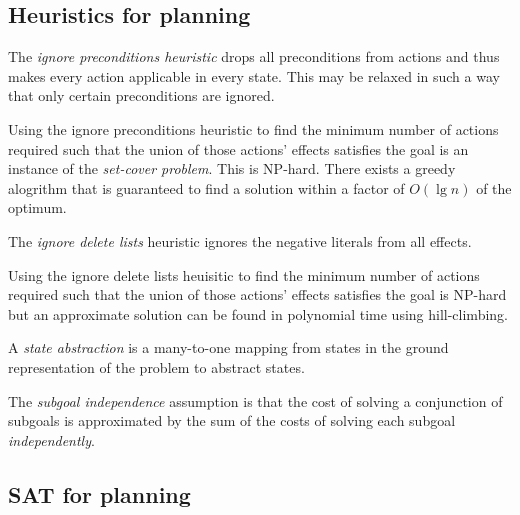 \documentclass{article}
\begin{document}
\subsection{Heuristics for planning}

\begin{definition}
    The \emph{ignore preconditions heuristic} drops all preconditions from actions
    and thus makes every action applicable in every state. This may be relaxed in
    such a way that only certain preconditions are ignored.
\end{definition}

\begin{theorem}
    Using the ignore preconditions heuristic to find the minimum number of 
    actions required such that the union of those actions'
    effects satisfies the goal is an instance of the \emph{set-cover problem}. This
    is NP-hard. There exists a greedy alogrithm that is guaranteed to find a solution
    within a factor of $O(\lg n)$ of the optimum.
\end{theorem}

\begin{definition}
    The \emph{ignore delete lists} heuristic ignores the negative literals from all
    effects.
\end{definition}

\begin{theorem}
    Using the ignore delete lists heuisitic to find the minimum number of actions 
    required such that the union of those actions' effects satisfies the goal 
    is NP-hard but an approximate solution can be found in polynomial time using
    hill-climbing.
\end{theorem}

\begin{definition}
    A \emph{state abstraction} is a many-to-one mapping from states in the ground
    representation of the problem to abstract states.
\end{definition}

\begin{definition}
    The \emph{subgoal independence} assumption is that the cost of solving a conjunction
    of subgoals is approximated by the sum of the costs of solving each subgoal
    \emph{independently}.
\end{definition}

\subsection{SAT for planning}
\end{document}
